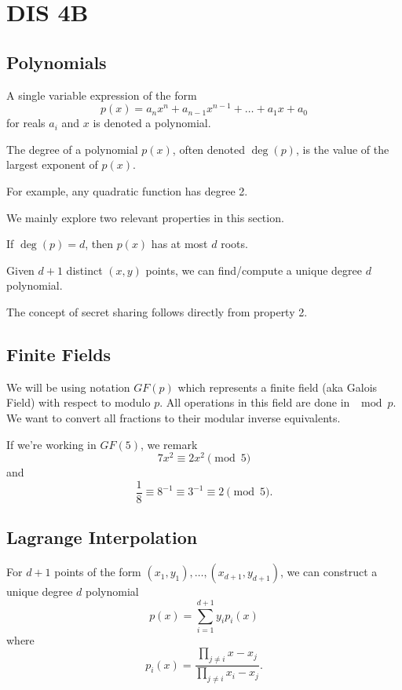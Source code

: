 \section{DIS 4B}

\subsection{Polynomials}
A single variable expression of the form \[ p(x) = a_n x^n + a_{n-1} x^{n-1} + \ldots + a_1x + a_0 \] for reals $a_i$ and $x$ is denoted a polynomial. 
\begin{definition}[degree]
    The degree of a polynomial $p(x)$, often denoted $\deg(p)$, is the value of the largest exponent of $p(x)$. 
\end{definition}
For example, any quadratic function has degree 2. 

We mainly explore two relevant properties in this section.

\begin{note}[Proprety 1]
    If $\deg(p) = d$, then $p(x)$ has at most $d$ roots.
\end{note}
\begin{note}[Property 2]
    Given $d+1$ distinct $(x,y)$ points, we can find/compute a unique degree $d$ polynomial. 
\end{note}

The concept of secret sharing follows directly from property 2. 

\subsection{Finite Fields}
We will be using notation $GF(p)$ which represents a finite field (aka Galois Field) with respect to modulo $p$. All operations in this field are done in $\mod p$. We want to convert all fractions to their modular inverse equivalents. 

\begin{example}
    If we're working in $GF(5)$, we remark \[ 7x^2 \equiv 2x^2 \pmod{5} \] and \[ \frac{1}{8} \equiv 8^{-1} \equiv 3^{-1} \equiv 2 \pmod{5}. \]
\end{example}

\subsection{Lagrange Interpolation}
For $d+1$ points of the form $(x_1, y_1), \ldots, (x_{d+1}, y_{d+1})$, we can construct a unique degree $d$ polynomial \[ p(x) = \sum_{i=1}^{d+1} y_i p_{i}(x) \] where \[ p_{i}(x) = \frac{\prod_{j \neq i} x - x_j}{\prod_{j \neq i} x_i - x_j}. \]